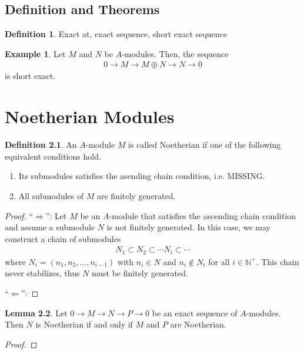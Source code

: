 \documentclass[a4paper]{book}
\theoremstyle{definition}
\newtheorem{definition}{Definition}[]
\newtheorem{example}{Example}[definition]
\newtheorem{lemma}[definition]{Lemma}
\begin{document}
\section{Definition and Theorems}

\begin{defbox}
    \begin{definition}
        Exact at, exact sequence, short exact sequence    
    \end{definition}
\end{defbox}

\begin{exmbox}
    \begin{example}
        Let \(M\) and \(N\) be \(A\)-modules. Then, the sequence
        \begin{align*}
            0 \rightarrow M \rightarrow M \oplus N \rightarrow N \rightarrow 0
        \end{align*}
        is short exact.
    \end{example}
\end{exmbox}

\chapter{Noetherian Modules}

\begin{defbox}
    \begin{definition}
        An \(A\)-module \(M\) is called Noetherian if one of the following equivalent conditions hold.
        \begin{enumerate}
            \item Its submodules satisfies the asending chain condition, i.e. MISSING.
            \item All submodules of \(M\) are finitely generated.
        \end{enumerate}
    \end{definition}
\end{defbox}

\begin{proof}
    ``\(\Rightarrow\)'': Let \(M\) be an \(A\)-module that satisfies the ascending chain condition and assume a submodule \(N\) is not finitely generated. In this case, we may construct a chain of submodules
    \begin{align*}
        N_1 \subset N_2 \subset \cdots N_i \subset \cdots
    \end{align*}
    where \(N_i = (n_1, n_2, \ldots, n_{i-1})\) with \(n_i \in N\) and \(n_i \not\in N_i\) for all \(i \in \mathbb{N}^+\). This chain never stabilizes, thus \(N\) must be finitely generated.

    \noindent``\(\Leftarrow\)'':
\end{proof}

\begin{thmbox}
    \begin{lemma}
        Let \(0 \rightarrow M \rightarrow N \rightarrow P \rightarrow 0\) be an exact sequence of \(A\)-modules. Then \(N\) is Noetherian if and only if \(M\) and \(P\) are Noetherian.
    \end{lemma}
\end{thmbox}
\begin{proof}
    
\end{proof}
\end{document}
